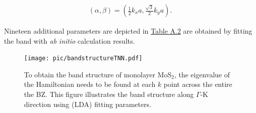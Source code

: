 \documentclass{report}
\begin{document}
\begin{equation}
	\begin{aligned}
		(\alpha,\beta) = \left(\frac{1}{2}k_{x}a,\frac{\sqrt{3}}{2}k_{y}a\right).
	\end{aligned}
\end{equation}

Nineteen additional parameters are depicted in \hyperref[A.2]{Table A.2} are obtained by fitting the band with \textit{ab initio} calculation results.

\begin{figure}[htb]
	\centering
	\texttt{[image: pic/bandstructureTNN.pdf]}
	\caption[Band structure of $\mathrm{MoS}_2$ material along $\Gamma$-K direction]{\label{band structure}To obtain the band structure of monolayer MoS$_{2}$, the eigenvalue of the Hamiltonian needs to be found at each $k$ point across the entire the \ac{BZ}. This figure illustrates the band structure along $\Gamma$-K direction using (LDA) fitting parameters.}
\end{figure}
\newpage
\end{document}
